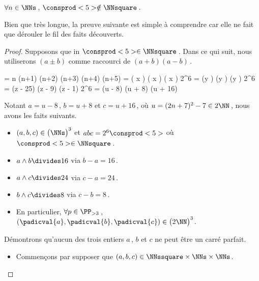 \begin{fact} \label{case-6}
	 $\forall n \in \NNs$\,, $\consprod<5> \notin \NNsquare$\,.
\end{fact}



Bien que très longue, la preuve suivante est simple à comprendre car elle ne fait que dérouler le fil des faits découverts.

\begin{proof}
    Supposons que in $\consprod<5> \in \NNsquare$\,. Dans ce qui suit, nous utiliserons $(a \pm b)$ comme raccourci de $(a + b) (a - b)$\,.

    \medskip
    \begin{stepcalc}[style = ar*, ope = \iff]
    	 = 
			n (n+1) (n+2) (n+3) (n+4) (n+5)
    	\consprod<5> = 
			\big( x \pm {} \big) \big( x \pm {} \big) \big( x \pm {} \big) 
    	2^6 \consprod<5> = 
			(y ) (y ) (y )
    	2^6 \consprod<5> = 
			(z - 25) (z - 9) (z - 1) 
    	2^6 \consprod<5> = 
			(u - 8) (u + 8) (u + 16)
    \end{stepcalc}

    \medskip
    Notant $a = u - 8$\,, $b = u + 8$ et $c = u + 16$\,, où $u = (2 n + 7)^2 - 7 \in 2 \NN$\,, nous avons les faits suivants.
    
    \begin{itemize}
		\item $(a, b, c) \in \big( \NNs \big)^3$ et $abc = 2^6 \consprod<5>$ où $\consprod<5> \in \NNsquare$\,.

		\item $a \wedge b \divides 16$ via $b - a = 16$\,.

		\item $a \wedge c \divides 24$ via $c - a = 24$\,.

		\item $b \wedge c \divides 8$  via $c - b = 8$\,.

		\item En particulier, 
		$\forall p \in \PP_{>3}$\,, 
		$(\padicval{a}, \padicval{b}, \padicval{c}) \in \big( 2 \NN \big)^3$.
	\end{itemize}


	Démontrons qu'aucun des trois entiers $a$\,, $b$ et $c$ ne peut être un carré parfait.
	\begin{itemize}
		\medskip
		\item Commençons par supposer que $(a, b, c) \in \NNssquare \times \NNs \times \NNs$. 
		

\end{itemize}
\end{proof}
